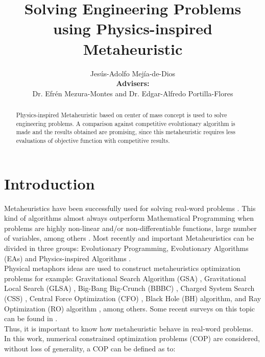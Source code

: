 \documentclass[12pt,letterpape]{article}
\title{Solving Engineering Problems using Physics-inspired Metaheuristic}
\author{Jesús-Adolfo Mejía-de-Dios
\\
{\bf Advisers:}\\
Dr. 
Efrén Mezura-Montes
and
Dr.
Edgar-Alfredo Portilla-Flores
}
\begin{document}
\maketitle

\begin{abstract}
	Physics-inspired Metaheuristic based on center of mass concept is used to solve
	engineering problems. A comparison against competitive evolutionary algorithm
	is made and the results obtained are promising, since this metaheuristic requires
	less evaluations of objective function with competitive results.
\end{abstract}

\section{Introduction} %
\label{sec:introduction}

Metaheuristics have been successfully used for solving real-word problems \cite{easSurv}.
This kind of algorithms almost always outperform Mathematical Programming when problems
are highly non-linear and/or non-differentiable functions, large number of variables, 
among others \cite{problemas}. Most recently and important Metaheuristics can be divided in three
groups: Evolutionary Programming, Evolutionary Algorithms (EAs) and Physics-inspired
Algorithms \cite{biswas2013physics, easSurv, DBLP:journals/corr/FisterYFBF13,spall03}.\\

Physical metaphors ideas are used to construct metaheuristics optimization problems
for example: Gravitational  Search Algorithm (GSA) \cite{rashedi2009gsa}, 
Gravitational Local Search (GLSA) \cite{glsa}, Big-Bang Big-Crunch (BBBC) \cite{erol2006new}, 
Charged System Search (CSS) \cite{kaveh2010novel}, Central Force Optimization 
(CFO) \cite{cfo2007}, Black Hole (BH) \cite{hatamlou2013black} algorithm, and Ray 
Optimization (RO) algorithm \cite{kaveh2012new}, among others. Some recent surveys 
on this topic can be found in
\cite{fisicaSurvey,biswas2013physics,DBLP:journals/corr/FisterYFBF13,xie2011convergence}. \\

Thus, it is important to know how metaheuristic behave in real-word problems.
In this work, numerical constrained optimization problems (COP) are considered,
without loss of generality, a COP can be defined as to:\\
\end{document}
